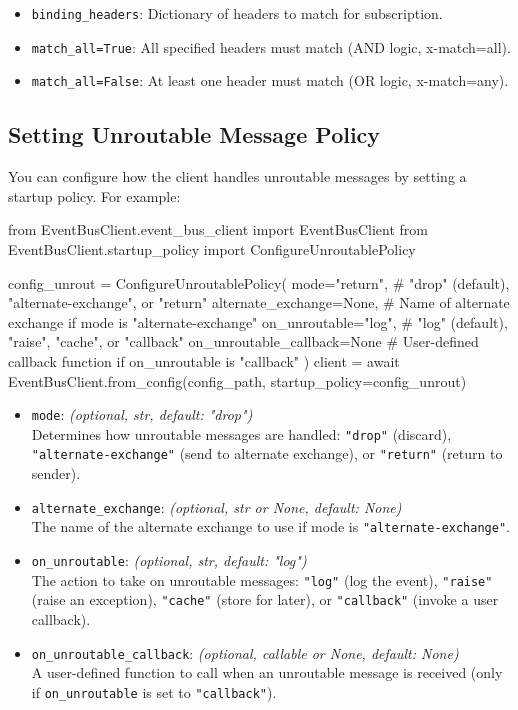\begin{itemize}
  \item \texttt{binding\_headers}: Dictionary of headers to match for subscription.
  \item \texttt{match\_all=True}: All specified headers must match (AND logic, x-match=all).
  \item \texttt{match\_all=False}: At least one header must match (OR logic, x-match=any).
\end{itemize}


\subsection{Setting Unroutable Message Policy}
You can configure how the client handles unroutable messages by setting a startup policy. For example:

\begin{pythoncode}
from EventBusClient.event_bus_client import EventBusClient
from EventBusClient.startup_policy import ConfigureUnroutablePolicy

config_unrout = ConfigureUnroutablePolicy(
    mode="return",                # "drop" (default), "alternate-exchange", or "return"
    alternate_exchange=None,      # Name of alternate exchange if mode is "alternate-exchange"
    on_unroutable="log",           # "log" (default), "raise", "cache", or "callback"
    on_unroutable_callback=None   # User-defined callback function if on_unroutable is "callback"
)
client = await EventBusClient.from_config(config_path, startup_policy=config_unrout)
\end{pythoncode}

\begin{itemize}
  \item \texttt{mode}: \emph{(optional, str, default: "drop")} \\
    Determines how unroutable messages are handled: \texttt{"drop"} (discard), \texttt{"alternate-exchange"} (send to alternate exchange), or \texttt{"return"} (return to sender).


  \item \texttt{alternate\_exchange}: \emph{(optional, str or None, default: None)} \\
    The name of the alternate exchange to use if mode is \texttt{"alternate-exchange"}.
  \item \texttt{on\_unroutable}: \emph{(optional, str, default: "log")} \\
    The action to take on unroutable messages: \texttt{"log"} (log the event), \texttt{"raise"} (raise an exception), \texttt{"cache"} (store for later), or \texttt{"callback"} (invoke a user callback).
  \item  \texttt{on\_unroutable\_callback}: \emph{(optional, callable or None, default: None)} \\
    A user-defined function to call when an unroutable message is received (only if \texttt{on\_unroutable} is set to \texttt{"callback"}).
\end{itemize}

